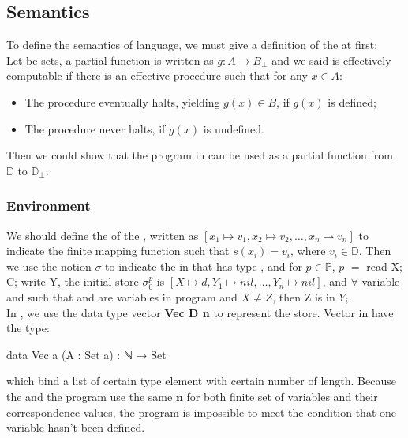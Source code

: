 \subsection{Semantics}\label{definition: semantics}
To define the semantics of \WHILE language, we must give a definition of the  at first\cite{jones_computability_1997}:\\
Let  be sets, a partial function  is written as $g: A \rightarrow B_\bot$ and we said  is effectively computable if there is an effective procedure such that for any $x \in A$:
\begin{itemize}
  \item The procedure eventually halts, yielding $g(x) \in B$, if $g(x)$ is defined;
  \item The procedure never halts, if $g(x)$ is undefined.
\end{itemize}
Then we could show that the program in \WHILE can be used as a partial function from $\mathds{D}$ to $\mathds{D}_\bot$.
\subsubsection{Environment}
We should define the  of the , written as $[x_1 \mapsto v_1, x_2 \mapsto v_2, \dots,x_n \mapsto v_n]$ to indicate the finite mapping function such that $s(x_i) = v_i$, where $v_i \in \mathds{D}$.
Then we use the notion $\sigma$ to indicate the  in \WHILE that has type ,
and for $p \in \mathds{P}$, $p$ $=$ read X; C; write Y, the initial store $\sigma_0^p$ is $[X \mapsto d, Y_1 \mapsto nil, \dots,Y_n \mapsto nil]$, and $\forall$ variable  and  such that  and  are variables in program  and $X \neq Z$, then Z is in $Y_i$.\\
In \Agda, we use the data type vector \textbf{Vec D n} to represent the store. Vector in \Agda have the type:
\begin{code}
data Vec {a} (A : Set a) : ℕ → Set
\end{code}
which bind a list of certain type element with certain number of length.
Because the  and the program use the same $\textbf{n}$ for both finite set of variables and their correspondence values,
the program is impossible to meet the condition that one variable hasn't been defined.
